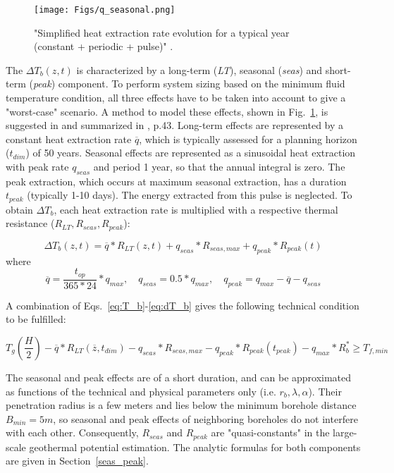 \begin{figure}
    \centering
    \texttt{[image: Figs/q\_seasonal.png]}
    \caption{"Simplified heat extraction rate evolution for a typical year (constant + periodic + pulse)" \citep{pahud_geothermal_2002}.}
    \label{fig:q_seasonal}
\end{figure}

The $\Delta T_b(z, t)$ is characterized by a long-term (\textit{LT}), seasonal (\textit{seas}) and short-term (\textit{peak}) component. To perform system sizing based on the minimum fluid temperature condition, all three effects have to be taken into account to give a "worst-case" scenario. A method to model these effects, shown in Fig.~\ref{fig:q_seasonal}, is suggested in \citep{claesson_conductive_1988} and summarized in \citep{pahud_geothermal_2002}, p.43. Long-term effects are represented by a constant heat extraction rate $\overline{q}$, which is typically assessed for a planning horizon ($t_{dim}$) of 50 years. Seasonal effects are represented as a sinusoidal heat extraction with peak rate $q_{seas}$ and period 1 year, so that the annual integral is zero. The peak extraction, which occurs at maximum seasonal extraction, has a duration $t_{peak}$ (typically 1-10 days). The energy extracted from this pulse is neglected. To obtain $\Delta T_b$, each heat extraction rate is multiplied with a respective thermal resistance ($R_{LT},R_{seas},R_{peak}$):

\begin{equation}
\label{eq:dT_b}
    \textstyle \Delta T_b(z, t) = \overline{q} * R_{LT}(z, t) + q_{seas} * R_{seas, max} + q_{peak} * R_{peak}(t)
\end{equation}
where
\begin{equation*}
    \overline{q} = \frac{t_{op}}{365*24} * q_{max}, \quad q_{seas} = 0.5 * q_{max}, \quad q_{peak} = q_{max} - \overline{q} - q_{seas}
\end{equation*}

A combination of Eqs.~\ref{eq:T_b}-\ref{eq:dT_b} gives the following technical condition to be fulfilled:

\begin{equation}
    \textstyle T_g(\frac{H}{2}) - \overline{q} * R_{LT}(\overline{z}, t_{dim}) - q_{seas} * R_{seas, max} - q_{peak} * R_{peak}(t_{peak}) - q_{max}*R_b^* \geq T_{f, min}
\end{equation}

The seasonal and peak effects are of a short duration, and can be approximated as functions of the technical and physical parameters only (i.e. $r_b, \lambda, \alpha$). Their penetration radius is a few meters and lies below the minimum borehole distance $B_{min} = 5m$, so seasonal and peak effects of neighboring boreholes do not interfere with each other. Consequently, $R_{seas}$ and $R_{peak}$ are "quasi-constants" in the large-scale geothermal potential estimation. The analytic formulas for both components are given in Section~\ref{seas_peak}. 

